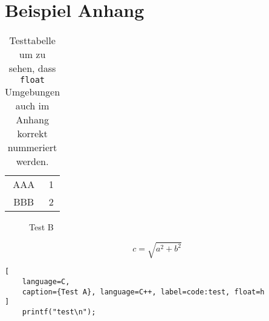 \section{Beispiel Anhang}
\label{apx:sec:exampleAppendix}

\begin{table}[H]
    \centering
    \begin{tabular}{|c|c|}
        \hline
        AAA & 1 \\
        BBB & 2 \\
        \hline
    \end{tabular}
\caption[Testtabelle]{Testtabelle um zu sehen, dass \texttt{float} Umgebungen auch im Anhang korrekt nummeriert werden.}
\end{table}

\begin{figure}[H]
    \caption[Test A]{Test B}
\end{figure}

\begin{equation}
    c = \sqrt{a^{2} + b^{2}}
    \label{eq:sqrt}
\end{equation}

\begin{lstlisting}[
    language=C,
    caption={Test A}, language=C++, label=code:test, float=h
]
    printf("test\n");
\end{lstlisting}
